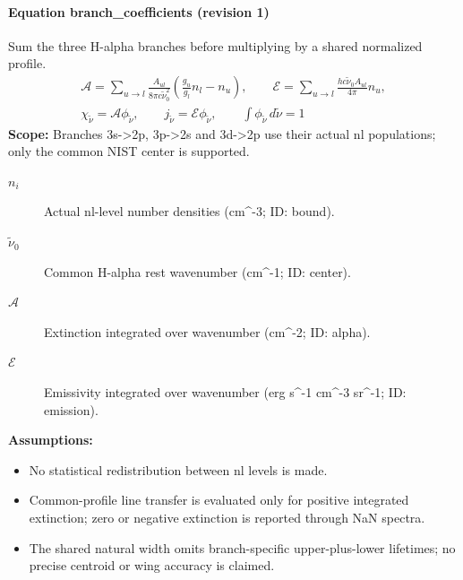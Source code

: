 \paragraph{Equation branch\_coefficients (revision 1)}
Sum the three H-alpha branches before multiplying by a shared normalized profile.
\begin{equation}
\begin{aligned}
\mathcal A=\sum_{u\to l}\frac{A_{ul}}{8\pi c\widetilde\nu_0^2}\left(\frac{g_u}{g_l}n_l-n_u\right),\qquad \mathcal E=\sum_{u\to l}\frac{hc\widetilde\nu_0 A_{ul}}{4\pi}n_u,\\\chi_{\widetilde\nu}=\mathcal A\phi_{\widetilde\nu},\qquad j_{\widetilde\nu}=\mathcal E\phi_{\widetilde\nu},\qquad \int\phi_{\widetilde\nu}\,d\widetilde\nu=1
\end{aligned}
\label{eq:escape.hydrogen_5f_nlte:branch_5f_coefficients:1}
\end{equation}
\noindent\textbf{Scope:} Branches 3s->2p, 3p->2s and 3d->2p use their actual nl populations; only the common NIST center is supported.

\begin{description}
\item[$n_i$] Actual nl-level number densities (cm\textasciicircum{}-3; ID: bound).
\item[$\widetilde\nu_0$] Common H-alpha rest wavenumber (cm\textasciicircum{}-1; ID: center).
\item[$\mathcal A$] Extinction integrated over wavenumber (cm\textasciicircum{}-2; ID: alpha).
\item[$\mathcal E$] Emissivity integrated over wavenumber (erg s\textasciicircum{}-1 cm\textasciicircum{}-3 sr\textasciicircum{}-1; ID: emission).
\end{description}

\noindent\textbf{Assumptions:}
\begin{itemize}
\item No statistical redistribution between nl levels is made.
\item Common-profile line transfer is evaluated only for positive integrated extinction; zero or negative extinction is reported through NaN spectra.
\item The shared natural width omits branch-specific upper-plus-lower lifetimes; no precise centroid or wing accuracy is claimed.
\end{itemize}

